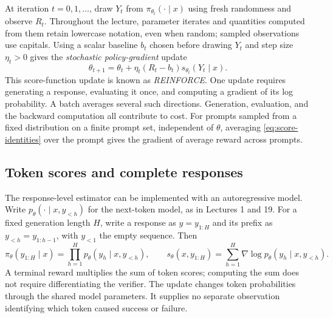\documentclass[11pt,twoside]{article}
\theoremstyle{definition}
\theoremstyle{remark}
\begin{document}
At iteration $t=0,1,\ldots$, draw $Y_t$ from
$\pi_{\theta_t}(\cdot\mid x)$ using fresh randomness and observe $R_t$.
Throughout the lecture, parameter iterates and quantities computed from
them retain lowercase notation, even when random; sampled observations
use capitals. Using a scalar baseline $b_t$ chosen before drawing $Y_t$
and step size $\eta_t>0$ gives the
\emph{stochastic policy-gradient} update
\begin{equation}
 \theta_{t+1}=\theta_t+
 \eta_t(R_t-b_t)s_{\theta_t}(Y_t\mid x).
 \label{eq:sampled-update}
\end{equation}
This score-function update is known as \emph{REINFORCE}.
One update requires generating a response, evaluating it once, and computing
a gradient of its log probability. A batch averages several such directions.
Generation, evaluation, and the backward computation all contribute to cost.
For prompts sampled from a fixed distribution on a finite prompt set,
independent of $\theta$,
averaging \cref{eq:score-identities} over the prompt gives the gradient of
average reward across prompts.

\subsection{Token scores and complete responses}

The response-level estimator can be implemented with an autoregressive
model. Write $p_\theta(\cdot\mid x,y_{<h})$ for the next-token model,
as in Lectures 1 and 19. For a fixed generation length $H$, write a
response as $y=y_{1:H}$ and its prefix as $y_{<h}=y_{1:h-1}$, with
$y_{<1}$ the empty sequence. Then
\begin{equation}
 \pi_\theta(y_{1:H}\mid x)=\prod_{h=1}^H
 p_\theta(y_h\mid x,y_{<h}),\qquad
 s_\theta(x,y_{1:H})=\sum_{h=1}^H
 \nabla\log p_\theta(y_h\mid x,y_{<h}).
 \label{eq:token-score}
\end{equation}
A terminal reward multiplies the sum
of token scores; computing the sum does not require differentiating the
verifier. The update changes token probabilities through the shared model
parameters. It supplies no separate observation identifying which token
caused success or failure.
\end{document}
